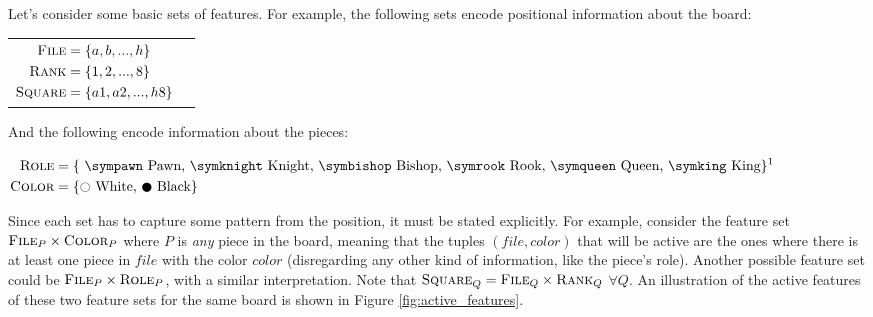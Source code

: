 Let's consider some basic sets of features. For example, the following sets encode positional information about the board:

\begin{center}
\begin{tabular}{cc}

$\begin{aligned}[t]
\textsc{File} &= \{a, b, ..., h\} \\
\textsc{Rank} &= \{1, 2, ..., 8\} \\
\textsc{Square} &= \{a1, a2, ..., h8\}
\end{aligned}$

&

\raisebox{-10ex}{
\chessboard[
    tinyboard,
    showmover=false,
    pgfstyle={text},
    text=\fontsize{1.2ex}{1.2ex}\bfseries\sffamily \currentwq,
    markboard
]
}

\end{tabular}
\end{center}

And the following encode information about the pieces:

\begin{center}
$\begin{aligned}[t]
\featureset{Role} &= \text{\{
    \sympawn\ Pawn,
    \symknight\ Knight,
    \symbishop\ Bishop,
    \symrook\ Rook,
    \symqueen\ Queen,
    \symking\ King\}}\textsuperscript{1} \\
\featureset{Color} &= \text{\{\white\ White, \black\ Black\}}
\end{aligned}$
\end{center}


Since each set has to capture some pattern from the position, it must be stated explicitly. For example, consider the feature set $\textsc{File}_{P} \times \textsc{Color}_{P}$ where $P$ is \textit{any} piece in the board, meaning that the tuples $(file, color)$ that will be active are the ones where there is at least one piece in $file$ with the color $color$ (disregarding any other kind of information, like the piece's role). Another possible feature set could be $\textsc{File}_{P} \times \textsc{Role}_{P}$, with a similar interpretation. Note that $\textsc{Square}_Q = \textsc{File}_Q \times \textsc{Rank}_Q$ $\forall Q$. An illustration of the active features of these two feature sets for the same board is shown in Figure \ref{fig:active_features}.

